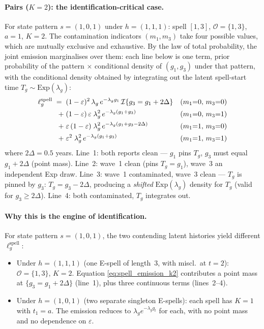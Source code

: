 \paragraph{Pairs (\(K = 2\)): the identification-critical case.}
For state pattern \(s = (1,0,1)\) under \(h = (1,1,1)\): spell \([1,3]\),
\(\mathcal{O} = \{1,3\}\), \(a = 1\), \(K = 2\). The contamination
indicators \((m_1, m_3)\) take four possible values, which are
mutually exclusive and exhaustive. By the law of total probability, the
joint emission marginalises over them: each line below is one term, prior probability of the pattern \(\times\) conditional density of
\((g_1, g_3)\) under that pattern, with the conditional density
obtained by integrating out the latent spell-start time
\(T_g \sim \mathrm{Exp}(\lambda_g)\):
\begin{align}
\ell^{\mathrm{spell}}_g \;=\;\;
  & (1-\varepsilon)^2\,\lambda_g\, e^{-\lambda_g g_1}\,
    \mathcal{I}\{g_3 = g_1 + 2\Delta\}
    && (m_1{=}0,\, m_3{=}0) \notag \\
+\; & (1-\varepsilon)\,\varepsilon\;\lambda_g^2\,
    e^{-\lambda_g(g_1 + g_3)}
    && (m_1{=}0,\, m_3{=}1) \notag \\
+\; & \varepsilon\,(1-\varepsilon)\;\lambda_g^2\,
    e^{-\lambda_g(g_1 + g_3 - 2\Delta)}
    && (m_1{=}1,\, m_3{=}0) \notag \\
+\; & \varepsilon^2\;\lambda_g^2\,
    e^{-\lambda_g(g_1 + g_3)}
    && (m_1{=}1,\, m_3{=}1)
\label{eq:spell_emission_k2}
\end{align}
where \(2\Delta = 0.5\) years. Line~1: both reports clean --- \(g_1\) pins
\(T_g\), \(g_3\) must equal \(g_1 + 2\Delta\) (point mass). Line~2: wave~1
clean (pins \(T_g = g_1\)), wave~3 an independent Exp draw. Line~3:
wave~1 contaminated, wave~3 clean --- \(T_g\) is pinned by \(g_3\):
\(T_g = g_3 - 2\Delta\), producing a \emph{shifted}
\(\mathrm{Exp}(\lambda_g)\) density for \(T_g\) (valid for
\(g_3 \ge 2\Delta\)). Line~4: both contaminated, \(T_g\) integrates out.

\paragraph{Why this is the engine of identification.}
For state pattern \(s = (1,0,1)\), the two contending latent histories
yield different \(\ell^{\mathrm{spell}}_g\):

\begin{itemize}
\item Under \(h = (1,1,1)\) (one E-spell of length~3, with miscl.\ at
  \(t=2\)): \(\mathcal{O} = \{1,3\}\), \(K = 2\). Equation
  \eqref{eq:spell_emission_k2} contributes a point mass at
  \(\{g_3 = g_1 + 2\Delta\}\) (line~1), plus three continuous terms
  (lines~2--4).
\item Under \(h = (1,0,1)\) (two separate singleton E-spells): each
  spell has \(K = 1\) with \(t_1 = a\). The emission reduces to
  \(\lambda_g e^{-\lambda_g g_t}\) for each, with no point mass and no
  dependence on \(\varepsilon\).
\end{itemize}

